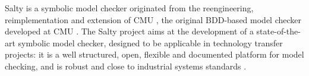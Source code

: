 Salty is a symbolic model checker originated from the
reengineering, reimplementation and extension of CMU , the
original BDD-based model checker developed at CMU \cite{McMil93}.
The Salty project aims at the development of a state-of-the-art
symbolic model checker, designed to be applicable in technology
transfer projects: it is a well structured, open, flexible and
documented platform for model checking, and is robust and close to
industrial systems standards \cite{CCGR00}.

